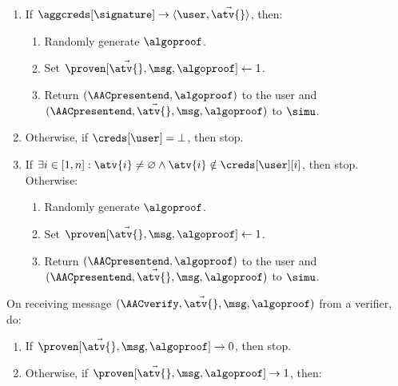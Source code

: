 \begin{framed}
	\begin{enumerate}

	  \item If $\aggcreds[\signature] \rightarrow \langle \user,
\vec{\atv{}}\rangle$, then:

	    \begin{enumerate}

	      \item Randomly generate $\algoproof$.  \item Set
$\proven[\vec{\atv{}}, \msg, \algoproof] \leftarrow 1$.

	      \item Return $(\AACpresentend, \algoproof)$ to the user and
$(\AACpresentend, \vec{\atv{}}, \msg, \allowbreak \algoproof)$ to $\simu$.

	    \end{enumerate}

	  \item Otherwise, if $\creds[\user] = \bot$, then stop.

	  \item If $\exists i \in [1, n]: \atv{i} \neq \varnothing \land \atv{i}
\notin \creds[\user][i]$, then stop. Otherwise:

	    \begin{enumerate}

	      \item Randomly generate $\algoproof$.

	      \item Set $\proven[\vec{\atv{}}, \msg, \algoproof] \leftarrow 1$.

	      \item Return $(\AACpresentend,  \algoproof)$ to the user and
$(\AACpresentend, \vec{\atv{}}, \msg, \allowbreak \algoproof)$ to $\simu$.

	    \end{enumerate}

	\end{enumerate}

	\fuinterface{\AACverify} On receiving message $(\AACverify, \vec{\atv{}},
\allowbreak \msg, \algoproof)$ from a verifier, do:

	\begin{enumerate}

	  \item If $\proven[\vec{\atv{}}, \msg, \algoproof] \rightarrow 0$, then
stop.

	  \item Otherwise, if $\proven[\vec{\atv{}}, \msg, \algoproof]
\rightarrow 1$, then:


\end{enumerate}
\end{framed}
